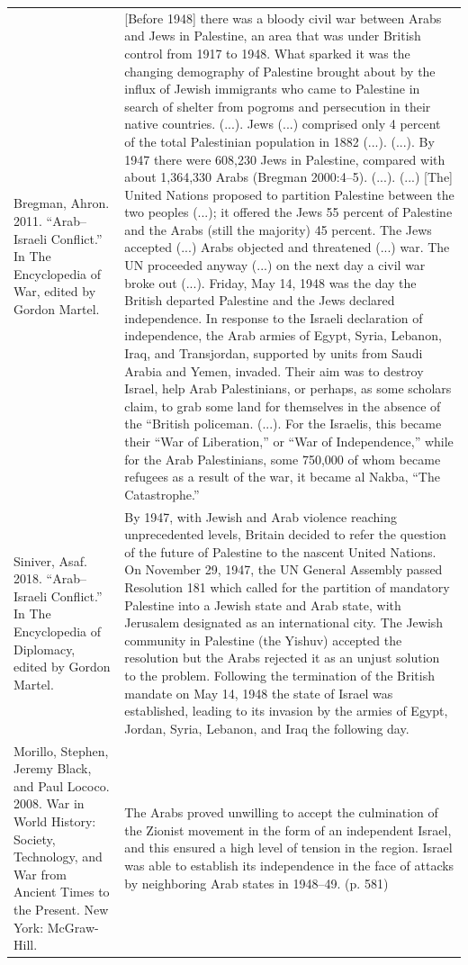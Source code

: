 {\begin{longtable}{p{}p{}}
Bregman, Ahron. 2011. “Arab–Israeli Conflict.” In The Encyclopedia of War, edited by Gordon Martel. & [Before 1948] there was a bloody civil war between Arabs and Jews in Palestine, an area that was under British control from 1917 to 1948. What sparked it was the changing demography of Palestine brought about by the influx of Jewish immigrants who came to Palestine in search of shelter from pogroms and persecution in their native countries. (...). Jews (...) comprised only 4 percent of the total Palestinian population in 1882 (...). (...). By 1947 there were 608,230 Jews in Palestine, compared with about 1,364,330 Arabs (Bregman 2000:4–5). (...). (...) [The] United Nations proposed to partition Palestine between the two peoples (...); it offered the Jews 55 percent of Palestine and the Arabs (still the majority) 45 percent. The Jews accepted (...) Arabs objected and threatened (...) war. The UN proceeded anyway (...) on the next day a civil war broke out (...).
Friday, May 14, 1948 was the day the British departed Palestine and the Jews declared independence. In response to the Israeli declaration of independence, the Arab armies of Egypt, Syria, Lebanon, Iraq, and Transjordan, supported by units from Saudi Arabia and Yemen, invaded. Their aim was to destroy Israel, help Arab Palestinians, or perhaps, as some scholars claim, to grab some land for themselves in the absence of the “British policeman. (...). For the Israelis, this became their “War of Liberation,” or “War of Independence,” while for the Arab Palestinians, some 750,000 of whom became refugees as a result of the war, it became al Nakba, “The Catastrophe.”
\\
Siniver, Asaf. 2018. “Arab–Israeli Conflict.” In The Encyclopedia of Diplomacy, edited by Gordon Martel. & By 1947, with Jewish and Arab violence reaching unprecedented levels, Britain decided to refer the question of the future of Palestine to the nascent United Nations. On November 29, 1947, the UN General Assembly passed Resolution 181 which called for the partition of mandatory Palestine into a Jewish state and Arab state, with Jerusalem designated as an international city. The Jewish community in Palestine (the Yishuv) accepted the resolution but the Arabs rejected it as an unjust solution to the problem. Following the termination of the British mandate on May 14, 1948 the state of Israel was established, leading to its invasion by the armies of Egypt, Jordan, Syria, Lebanon, and Iraq the following day.
\\
Morillo, Stephen, Jeremy Black, and Paul Lococo. 2008. War in World History: Society, Technology, and War from Ancient Times to the Present. New York: McGraw-Hill. & The Arabs proved unwilling to accept the culmination of the Zionist movement in the form of an independent Israel, and this ensured a high level of tension in the region. Israel was able to establish its independence in the face of attacks by neighboring Arab states in 1948–49. (p. 581)

\end{longtable}}

